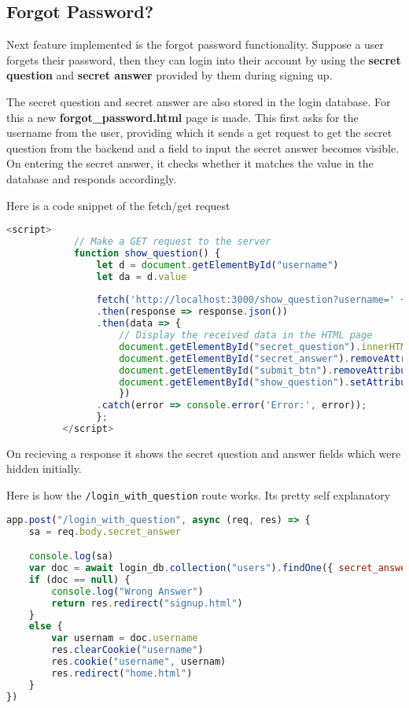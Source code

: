 \documentclass{article}
\begin{document}
\subsection{Forgot Password?}
Next feature implemented is the forgot password functionality. Suppose a user forgets their password, then they can login into their account by using the \textbf{secret question} and \textbf{secret answer} provided by them during signing up.

The secret question and secret answer are also stored in the login database.
For this a new \textbf{forgot\_password.html} page is made. This first asks for the username from the user, providing which it sends a get request to get the secret question from the backend and a field to input the secret answer becomes visible. On entering the secret answer, it checks whether it matches the value in the database and responds accordingly.

Here is a code snippet of the fetch/get request
\begin{lstlisting}[language=JavaScript]
    <script>
            // Make a GET request to the server
            function show_question() {
                let d = document.getElementById("username")
                let da = d.value
                
                fetch('http://localhost:3000/show_question?username=' + decodeURIComponent(da))
                .then(response => response.json())
                .then(data => {
                    // Display the received data in the HTML page
                    document.getElementById("secret_question").innerHTML += data.secret_question
                    document.getElementById("secret_answer").removeAttribute("hidden")
                    document.getElementById("submit_btn").removeAttribute("hidden")
                    document.getElementById("show_question").setAttribute("hidden")
                    })
                .catch(error => console.error('Error:', error));
                };
          </script>
\end{lstlisting}
On recieving a response it shows the secret question and answer fields which were hidden initially.

Here is how the \texttt{/login\_with\_question} route works. Its pretty self explanatory
\begin{lstlisting}[language=javascript]
    app.post("/login_with_question", async (req, res) => {
    sa = req.body.secret_answer

    console.log(sa)
    var doc = await login_db.collection("users").findOne({ secret_answer: sa })
    if (doc == null) {
        console.log("Wrong Answer")
        return res.redirect("signup.html")
    }
    else {
        var usernam = doc.username
        res.clearCookie("username")
        res.cookie("username", usernam)
        res.redirect("home.html")
    }
})
\end{lstlisting}
\end{document}
